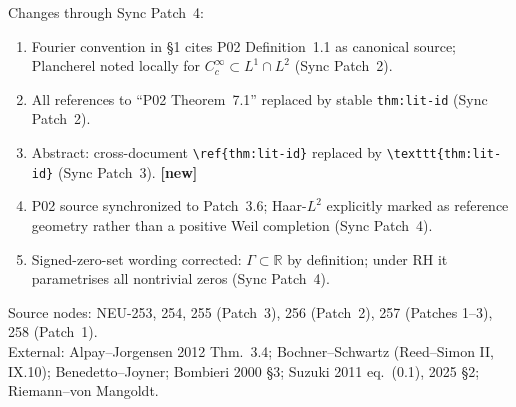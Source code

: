 \documentclass[11pt,a4paper]{amsart}
\begin{document}
\medskip
\noindent Changes through Sync Patch~4:
\begin{enumerate}
\item[(a)] Fourier convention in \S1 cites P02 Definition~1.1 as canonical source;
  Plancherel noted locally for $C_c^\infty\subset L^1\cap L^2$ (Sync Patch~2).
\item[(b)] All references to ``P02 Theorem~7.1'' replaced by stable
  \texttt{thm:lit-id} (Sync Patch~2).
\item[(c)] Abstract: cross-document \texttt{\textbackslash ref\{thm:lit-id\}} replaced
  by \texttt{\textbackslash texttt\{thm:lit-id\}} (Sync Patch~3). \textbf{[new]}
\item[(d)] P02 source synchronized to Patch~3.6; Haar-$L^2$ explicitly marked
  as reference geometry rather than a positive Weil completion (Sync Patch~4).
\item[(e)] Signed-zero-set wording corrected: $\Gamma\subset\mathbb R$ by
  definition; under RH it parametrises all nontrivial zeros (Sync Patch~4).
\end{enumerate}

\medskip
\noindent Source nodes: NEU-253, 254, 255 (Patch~3), 256 (Patch~2),
257 (Patches 1--3), 258 (Patch~1).\\
External: Alpay--Jorgensen 2012 Thm.~3.4;
Bochner--Schwartz (Reed--Simon II, IX.10);
Benedetto--Joyner; Bombieri 2000 \S3;
Suzuki 2011 eq.~(0.1), 2025 \S2;
Riemann--von Mangoldt.
\end{document}
